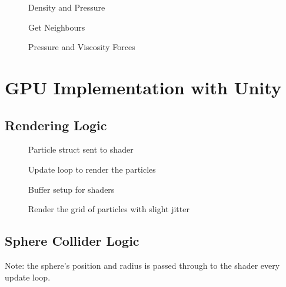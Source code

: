 \documentclass[12pt]{article}
\newcommand{\wideimage}[2][]{%
  \makebox[\textwidth][c]{\texttt{[image: \#2]}}%
}
\begin{document}
    \begin{figure}[H]
        \wideimage[]{densityPressureCPU.png}
        \caption{Density and Pressure}
    \end{figure}

    \begin{figure}[H]
        \wideimage[]{getNeighboursCPU.png}
        \caption{Get Neighbours}
    \end{figure}

    \begin{figure}[H]
        \wideimage[]{pressureViscosityForce.png}
        \caption{Pressure and Viscosity Forces}
    \end{figure}
    
    \section{GPU Implementation with Unity}

    \subsection{Rendering Logic}

    \begin{figure}[H]
        \wideimage[width=0.85\textwidth]{particleGPU.png}
        \caption{Particle struct sent to shader}
    \end{figure}

    \begin{figure}[H]
        \wideimage[width=0.85\textwidth]{renderGPU.png}
        \caption{Update loop to render the particles}
    \end{figure}

    \begin{figure}[H]
        \wideimage[]{setupBuffersGPU.png}
        \caption{Buffer setup for shaders}
    \end{figure}

    \begin{figure}[H]
        \wideimage[]{gridParticlesGPU.png}
        \caption{Render the grid of particles with slight jitter}
    \end{figure}

    \subsection{Sphere Collider Logic}

    Note: the sphere's position and radius is passed through to the shader every update loop.
\end{document}
